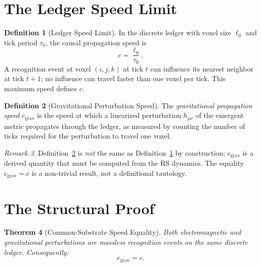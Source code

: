 \documentclass[12pt,a4paper]{article}
\newtheorem{theorem}{Theorem}[section]
\theoremstyle{definition}
\newtheorem{definition}[theorem]{Definition}
\theoremstyle{remark}
\newtheorem{remark}[theorem]{Remark}
\begin{document}
\section{The Ledger Speed Limit}
\label{sec:limit}

\begin{definition}[Ledger Speed Limit]
\label{def:c}
In the discrete ledger with voxel size $\ell_0$ and tick period
$\tau_0$, the causal propagation speed is
\begin{equation}
  c = \frac{\ell_0}{\tau_0}.
\end{equation}
A recognition event at voxel $(i, j, k)$ at tick $t$ can influence
its nearest neighbor at tick $t+1$; no influence can travel faster
than one voxel per tick.  This maximum speed defines $c$.
\end{definition}

\begin{definition}[Gravitational Perturbation Speed]
\label{def:cgrav}
The \emph{gravitational propagation speed} $c_{\mathrm{grav}}$ is
the speed at which a linearized perturbation $h_{\mu\nu}$ of the
emergent metric propagates through the ledger, as measured by
counting the number of ticks required for the perturbation to travel
one voxel.
\end{definition}

\begin{remark}
Definition~\ref{def:cgrav} is \emph{not} the same as
Definition~\ref{def:c} by construction; $c_{\mathrm{grav}}$ is a
derived quantity that must be computed from the RS dynamics.  The
equality $c_{\mathrm{grav}} = c$ is a non-trivial result, not a
definitional tautology.
\end{remark}

\section{The Structural Proof}
\label{sec:proof}

\begin{theorem}[Common-Substrate Speed Equality]
\label{thm:forced}
Both electromagnetic and gravitational perturbations are massless
recognition events on the same discrete ledger.  Consequently:
\begin{equation}
  c_{\mathrm{grav}} = c.
\end{equation}
\end{theorem}
\end{document}
